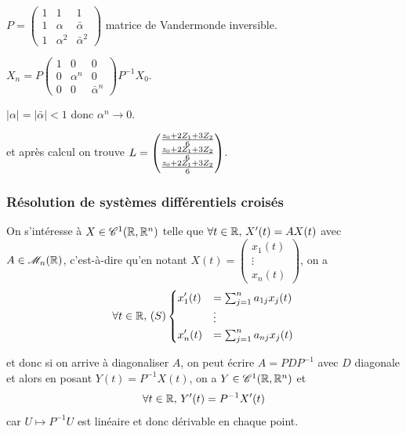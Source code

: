 \begin{exemple}
    $P = \begin{pmatrix}
        1 & 1 & 1 \\
        1 & \alpha & \bar \alpha \\
        1 & \alpha^2 & \bar \alpha^2
    \end{pmatrix}
    $ matrice de Vandermonde inversible.

    $X_n = P \begin{pmatrix}
        1 & 0 & 0 \\
        0 & \alpha^n & 0 \\
        0 & 0 & \bar \alpha^n
    \end{pmatrix} P^{-1} X_0$.

    $|\alpha| = |\bar \alpha| < 1$ donc $\alpha^n \to 0$.

    et après calcul on trouve $\displaystyle L = \begin{pmatrix}
        \frac{z_0 + 2 Z_1 + 3 Z_2}{6} \\
        \frac{z_0 + 2 Z_1 + 3 Z_2}{6} \\
        \frac{z_0 + 2 Z_1 + 3 Z_2}{6}
    \end{pmatrix}$.
\end{exemple}

\subsubsection{Résolution de systèmes différentiels croisés }

On s'intéresse à $X \in \mathscr C^1(\mathbb{R}, \mathbb{R}^n)$ telle que $\forall t \in \mathbb{R}, \, X'(t) = A X(t)$ 
avec $A \in \mathscr M_n(\mathbb{R})$, c'est-à-dire qu'en notant $X(t) = \begin{pmatrix}
x_1(t) \\
\vdots \\
x_n(t)
\end{pmatrix}$, on a $$\forall t \in \mathbb{R}, \,(S) \begin{cases}
\displaystyle x_1'(t) & = \sum_{j = 1 }^{n } a_{1j} x_j(t) \\
& \vdots \\
\displaystyle x_n'(t) & = \sum_{j = 1 }^{ n } a_{nj} x_j(t)
\end{cases}$$

et donc si on arrive à diagonaliser $A$, on peut écrire $A = PDP^{-1}$ avec $D$ diagonale
et alors en posant $Y(t) = P^{-1} X(t)$, on a $Y \in \mathscr C^1(\mathbb{R}, \mathbb{R}^n)$ et
$$\forall t \in \mathbb{R}, \, Y'(t) = P^{-1} X'(t) $$ car $U \mapsto P^{-1} U$ est linéaire et donc dérivable en chaque point.

